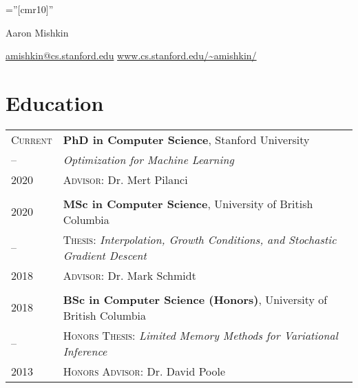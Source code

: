 \documentclass[10pt]{article}
\newcommand{\spacing}{\vspace{0.5cm}}
\begin{document}
\pagestyle{empty} %

\font\fb=''[cmr10]'' %

\par{\centering
{\Huge Aaron Mishkin} \par \vspace{0.25cm}
{\href{mailto:amishkin@cs.stanford.edu}{amishkin@cs.stanford.edu} \hspace{0.2cm} \href{http://www.cs.stanford.edu/~amishkin/}{www.cs.stanford.edu/\~{}amishkin/}} \par}

\spacing

\section{Education}
\begin{tabular}
    {R{1.8cm}|p{11cm}}
    \textsc{Current}      & \textbf{PhD in Computer Science}, Stanford University      \\
    { -- \hspace{0.2cm} } & \textit{Optimization for Machine Learning}                 \\
    \textsc{2020}         & \textsc{Advisor:}
    Dr.
    Mert Pilanci                                                                       \\  \\ \textsc{2020} & \textbf{MSc in
    Computer Science}, University of British Columbia                                  \\ { -- \hspace{0.2cm} } &
       \textsc{Thesis}: \textit{Interpolation, Growth Conditions, and Stochastic
    Gradient Descent}                                                                  \\ \textsc{2018} & \textsc{Advisor:} Dr.
    Mark Schmidt                                                                       \\  \\ \textsc{2018} & \textbf{BSc in
    Computer Science (Honors)}, University of British Columbia                         \\ { --
    \hspace{0.2cm} }      & \textsc{Honors Thesis:} \textit{Limited Memory Methods for
    Variational Inference}                                                             \\ \textsc{2013} & \textsc{Honors Advisor:} Dr.
       David Poole
\end{tabular}
\end{document}
